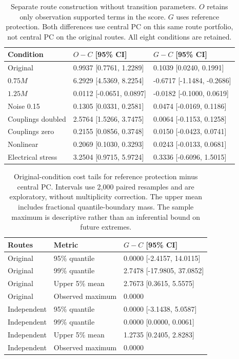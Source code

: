 \documentclass[journal]{IEEEtran}
\newcommand{\DIFnewtablecolor}{\color{blue}}
\begin{document}
\begin{table}[t]\DIFnewtablecolor
\centering
\caption{Separate route construction without transition parameters. $O$ retains only observation supported terms in the score. $G$ uses reference protection. Both differences use central PC on this same route portfolio, not central PC on the original routes. All eight conditions are retained.}
\label{tab:guarded-ablation}
\footnotesize\setlength{\tabcolsep}{3pt}\renewcommand{\arraystretch}{1.12}
\begin{tabular}{@{}p{}p{}p{}@{}}
\toprule
Condition & $O-C$ [95\% CI] & $G-C$ [95\% CI] \\
\midrule
Original & 0.9937 [0.7761, 1.2289] & 0.1039 [0.0240, 0.1991] \\
$0.75M$ & 6.2929 [4.5369, 8.2254] & -0.6717 [-1.1484, -0.2686] \\
$1.25M$ & 0.0112 [-0.0651, 0.0897] & -0.0182 [-0.1000, 0.0619] \\
Noise 0.15 & 0.1305 [0.0331, 0.2581] & 0.0474 [-0.0169, 0.1186] \\
Couplings doubled & 2.5764 [1.5266, 3.7475] & 0.0064 [-0.1153, 0.1258] \\
Couplings zero & 0.2155 [0.0856, 0.3748] & 0.0150 [-0.0423, 0.0741] \\
Nonlinear & 0.2069 [0.1030, 0.3293] & 0.0243 [-0.0133, 0.0681] \\
Electrical stress & 3.2504 [0.9715, 5.9724] & 0.3336 [-0.6096, 1.5015] \\
\bottomrule
\end{tabular}
\end{table}

\begin{table}[t]\DIFnewtablecolor
\centering
\caption{Original-condition cost tails for reference protection minus central PC. Intervals use 2,000 paired resamples and are exploratory, without multiplicity correction. The upper mean includes fractional quantile-boundary mass. The sample maximum is descriptive rather than an inferential bound on future extremes.}
\label{tab:guarded-tails}
\footnotesize\setlength{\tabcolsep}{3pt}\renewcommand{\arraystretch}{1.12}
\begin{tabular}{@{}lp{}p{}@{}}
\toprule
Routes & Metric & $G-C$ [95\% CI] \\
\midrule
Original & 95\% quantile & 0.0000 [-2.4157, 14.0115] \\
Original & 99\% quantile & 2.7478 [-17.9805, 37.0852] \\
Original & Upper 5\% mean & 2.7673 [0.3615, 5.5575] \\
Original & Observed maximum & 0.0000 \\
Independent & 95\% quantile & 0.0000 [-3.1438, 5.0587] \\
Independent & 99\% quantile & 0.0000 [0.0000, 0.0061] \\
Independent & Upper 5\% mean & 1.2735 [0.2405, 2.8283] \\
Independent & Observed maximum & 0.0000 \\
\bottomrule
\end{tabular}
\end{table}
\end{document}
